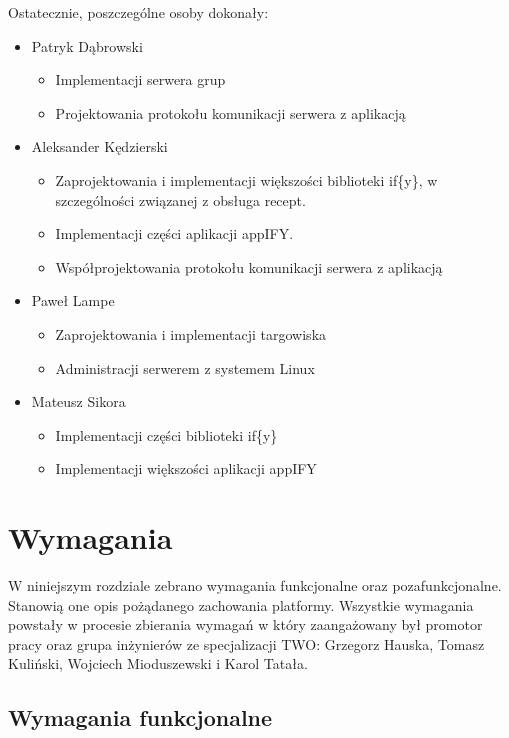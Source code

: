 \documentclass[11pt,a4paper,polish,thesis]{dcsbook}
\begin{document}
Ostatecznie, poszczególne osoby dokonały:
\begin{itemize}
\item Patryk Dąbrowski
\begin{itemize}
\item Implementacji serwera grup
\item Projektowania protokołu komunikacji serwera z aplikacją
\end{itemize}
\item Aleksander Kędzierski
\begin{itemize}
\item Zaprojektowania i implementacji większości biblioteki if\{y\}, w szczególności związanej z obsługa recept.
\item Implementacji części aplikacji appIFY.
\item Współprojektowania protokołu komunikacji serwera z aplikacją
\end{itemize}
\item Paweł Lampe
\begin{itemize}
\item Zaprojektowania i implementacji targowiska
\item Administracji serwerem z systemem Linux
\end{itemize}
\item Mateusz Sikora
\begin{itemize}
\item Implementacji części biblioteki if\{y\}
\item Implementacji większości aplikacji appIFY
\end{itemize}
\end{itemize}
\chapter{Wymagania}
W niniejszym rozdziale zebrano wymagania funkcjonalne oraz pozafunkcjonalne. Stanowią one opis pożądanego zachowania platformy. Wszystkie wymagania powstały
w procesie zbierania wymagań w który zaangażowany był promotor pracy oraz grupa inżynierów ze specjalizacji TWO: Grzegorz Hauska, Tomasz Kuliński, Wojciech
Mioduszewski i Karol Tatała.
\section{Wymagania funkcjonalne}
\end{document}
